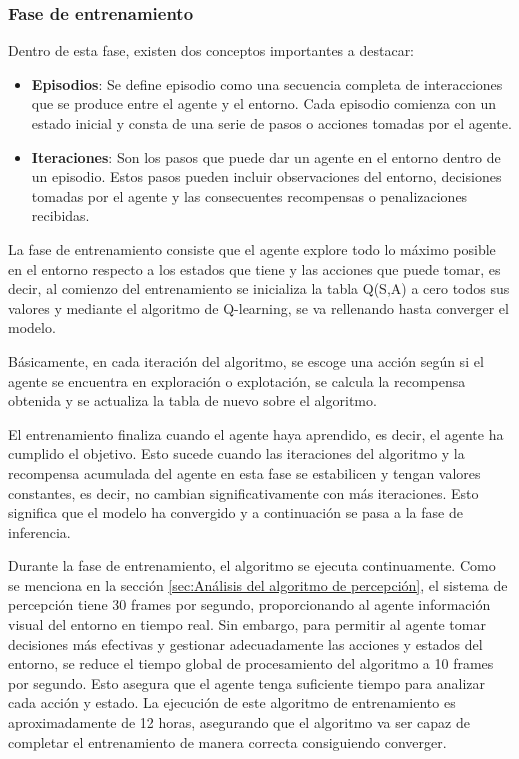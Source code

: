 \subsubsection{Fase de entrenamiento}
\label{sec:entrenamiento}
 Dentro de esta fase, existen dos conceptos importantes a destacar:
 \begin{itemize}
  \item \textbf{Episodios}: Se define episodio como una secuencia completa de interacciones que se produce entre el agente y el entorno. Cada episodio comienza con un estado inicial y consta de una serie 
  de pasos o acciones tomadas por el agente.
  \item \textbf{Iteraciones}: Son los pasos que puede dar un agente en el entorno dentro de un episodio. Estos pasos pueden incluir observaciones del entorno, decisiones tomadas por el agente
  y las consecuentes recompensas o penalizaciones recibidas.
\end{itemize}

 La fase de entrenamiento consiste que el agente explore todo lo máximo posible en el entorno respecto a los estados que tiene y las acciones que puede tomar, es decir, al comienzo del 
 entrenamiento se inicializa la tabla Q(S,A) a cero todos sus valores y mediante el algoritmo de Q-learning, se va rellenando hasta converger el modelo.
 
 Básicamente, en cada iteración del algoritmo, se escoge una acción según si el agente se encuentra en exploración o explotación, se calcula la recompensa obtenida y se actualiza la 
 tabla de nuevo sobre el algoritmo.

 El entrenamiento finaliza cuando el agente haya aprendido, es decir, el agente ha cumplido el objetivo. Esto sucede cuando las iteraciones del algoritmo y la recompensa acumulada del agente en esta 
 fase se estabilicen y tengan valores constantes, es decir, no cambian significativamente con más iteraciones. Esto significa que el modelo ha convergido y a continuación se pasa
 a la fase de inferencia. 

Durante la fase de entrenamiento, el algoritmo se ejecuta continuamente. Como se menciona en la sección \ref{sec:Análisis del algoritmo de percepción}, el sistema de percepción tiene 30 frames por
segundo, proporcionando al agente información visual del entorno en tiempo real. Sin embargo, para permitir al agente tomar decisiones más efectivas y gestionar adecuadamente las acciones 
y estados del entorno, se reduce el tiempo global de procesamiento del algoritmo a 10 frames por segundo. Esto asegura que el agente tenga suficiente tiempo para analizar cada acción y estado. La ejecución de este 
algoritmo de entrenamiento es aproximadamente de 12 horas, asegurando que el algoritmo va ser capaz de completar el entrenamiento de manera correcta consiguiendo converger. 

